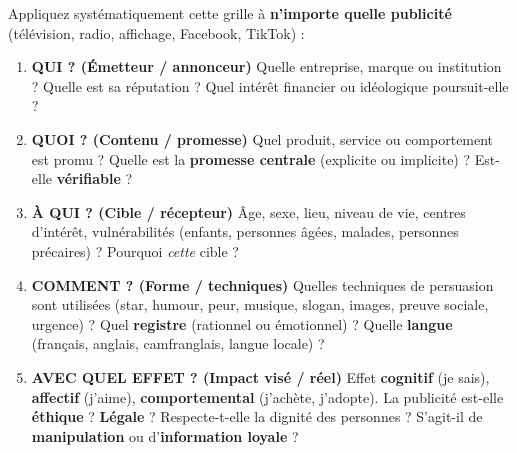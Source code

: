 \documentclass[11pt]{article}
\begin{document}
\begin{methode}
Appliquez systématiquement cette grille à \textbf{n'importe quelle publicité} (télévision, radio, affichage, Facebook, TikTok) :
\begin{enumerate}
    \item \textbf{QUI ? (Émetteur / annonceur)} Quelle entreprise, marque ou institution ? Quelle est sa réputation ? Quel intérêt financier ou idéologique poursuit-elle ?
    \item \textbf{QUOI ? (Contenu / promesse)} Quel produit, service ou comportement est promu ? Quelle est la \textbf{promesse centrale} (explicite ou implicite) ? Est-elle \textbf{vérifiable} ?
    \item \textbf{À QUI ? (Cible / récepteur)} Âge, sexe, lieu, niveau de vie, centres d'intérêt, vulnérabilités (enfants, personnes âgées, malades, personnes précaires) ? Pourquoi \emph{cette} cible ?
    \item \textbf{COMMENT ? (Forme / techniques)} Quelles techniques de persuasion sont utilisées (star, humour, peur, musique, slogan, images, preuve sociale, urgence) ? Quel \textbf{registre} (rationnel ou émotionnel) ? Quelle \textbf{langue} (français, anglais, camfranglais, langue locale) ?
    \item \textbf{AVEC QUEL EFFET ? (Impact visé / réel)} Effet \textbf{cognitif} (je sais), \textbf{affectif} (j'aime), \textbf{comportemental} (j'achète, j'adopte). La publicité est-elle \textbf{éthique} ? \textbf{Légale} ? Respecte-t-elle la dignité des personnes ? S'agit-il de \textbf{manipulation} ou d'\textbf{information loyale} ?
\end{enumerate}
\end{methode}
\end{document}
